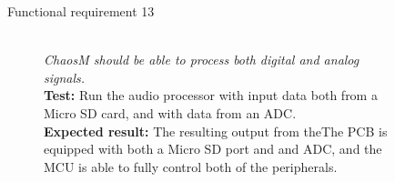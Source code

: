 \begin{figure}[H]
    \label{test:func-test13}
    \begin{description}
        \item[Functional requirement 13] \hfill \\
            \textit{\textit{ChaosM} should be able to process both digital and analog signals.} \\
            \textbf{Test:} Run the audio processor with input data both from a Micro SD card, and
            with data from an ADC. \\
            \textbf{Expected result:} The resulting output from theThe PCB is equipped with both a Micro SD port and and ADC, and the
            MCU is able to fully control both of the peripherals.\\
    \end{description}
\end{figure}
